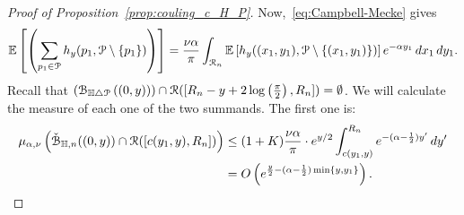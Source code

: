 \begin{proof}[Proof of Proposition~\ref{prop:couling_c_H_P}]
Now,~\eqref{eq:Campbell-Mecke} gives
\begin{align*}
\mathbb{E}\left[\left( \sum_{p_1 \in {\mathcal P}} 
		h_y (p_1, {\mathcal P} \setminus \{ p_1 \})\right)\right] 
	=\frac{\nu \alpha}{\pi} \int_{{\mathcal R}_n} \mathbb{E}\left[h_y((x_1,y_1), {\mathcal P} \setminus \{(x_1,y_1)\})\right]
		e^{-\alpha y_1} \, dx_1 \, dy_1.
\end{align*}
Recall that $({\mathcal B}_{\mathbb{H} \bigtriangleup {\mathcal P}}\left((0,y)\right))\cap {\mathcal R}([R_n - y + 2 \log\left(\frac{\pi}{2}\right),R_n]) = \emptyset$. 
We will calculate the measure of each one of the two summands. The first one is:
\begin{align*}
	\mu_{\alpha,\nu}\left( \check{{\mathcal B}}_{\mathbb{H},n}((0,y)) \cap  {\mathcal R}([c(y_1,y), R_n])\right) 
	&\leq (1+ K) \frac{\nu \alpha}{\pi} \cdot e^{y/2}  \int_{c(y_1,y)}^{R_n} e^{-(\alpha - \frac{1}{2}) y'} \, dy' \\
	&=  O\left(e^{\frac{y}{2} - (\alpha-\frac{1}{2}) \min \{y,y_1\}}\right).
\end{align*}


\end{proof}
